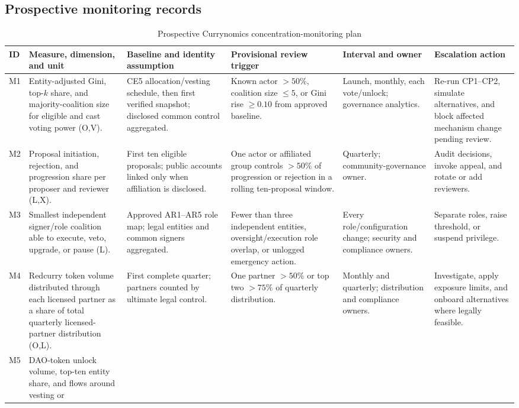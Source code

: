 \documentclass[10pt]{article}
\begin{document}
\begin{landscape}
\section*{Prospective monitoring records}
\begin{table}[h]
\caption{Prospective Currynomics concentration-monitoring plan}
\centering
\footnotesize
\begin{tabularx}{\linewidth}{@{}p{.05\linewidth}p{.16\linewidth}YYYY@{}}
\toprule
ID & Measure, dimension, and unit & Baseline and identity assumption & Provisional review trigger & Interval and owner & Escalation action \\
\midrule
M1 & Entity-adjusted Gini, top-$k$ share, and majority-coalition size for
eligible and cast voting power (O,V). & CE5 allocation/vesting schedule, then
first verified snapshot; disclosed common control aggregated. & Known actor
$>50\%$, coalition size $\leq5$, or Gini rise $\geq0.10$ from approved baseline.
& Launch, monthly, each vote/unlock; governance analytics. & Re-run CP1--CP2,
simulate alternatives, and block affected mechanism change pending review. \\
M2 & Proposal initiation, rejection, and progression share per proposer and
reviewer (L,X). & First ten eligible proposals; public accounts linked only
when affiliation is disclosed. & One actor or affiliated group controls
$>50\%$ of progression or rejection in a rolling ten-proposal window. &
Quarterly; community-governance owner. & Audit decisions, invoke appeal, and
rotate or add reviewers. \\
M3 & Smallest independent signer/role coalition able to execute, veto, upgrade,
or pause (L). & Approved AR1--AR5 role map; legal entities and common signers
aggregated. & Fewer than three independent entities, oversight/execution role
overlap, or unlogged emergency action. & Every role/configuration change;
security and compliance owners. & Separate roles, raise threshold, or suspend privilege. \\
M4 & Redcurry token volume distributed through each licensed partner as a
share of total quarterly licensed-partner distribution (O,L). & First
complete quarter; partners counted by ultimate legal control. & One partner
$>50\%$ or top two $>75\%$ of quarterly distribution. & Monthly and quarterly;
distribution and compliance owners. & Investigate, apply exposure limits, and
onboard alternatives where legally feasible. \\
M5 & DAO-token unlock volume, top-ten entity share, and flows around vesting or

\end{tabularx}
\end{table}
\end{landscape}
\end{document}
